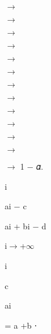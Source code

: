 \documentclass[a4paper,portrait,12pt]{article}
\begin{document}
$\rightarrow$


$\rightarrow$


$\rightarrow$


$\rightarrow$


$\rightarrow$


$\rightarrow$


$\rightarrow$


$\rightarrow$


$\rightarrow$


$\rightarrow$


$\rightarrow$


$\rightarrow$


\begin{flushleft}
$\rightarrow$ 1 $-$ 𝛼.
\end{flushleft}


\begin{flushleft}
i
\end{flushleft}





\begin{flushleft}
ai $-$ c
\end{flushleft}


\begin{flushleft}
ai + bi $-$ d
\end{flushleft}





\begin{flushleft}
i$\rightarrow$+$\infty$
\end{flushleft}





\begin{flushleft}
i
\end{flushleft}





\begin{flushleft}
c
\end{flushleft}





\begin{flushleft}
ai
\end{flushleft}





\begin{flushleft}
= a +b ⋅
\end{flushleft}
\end{document}
